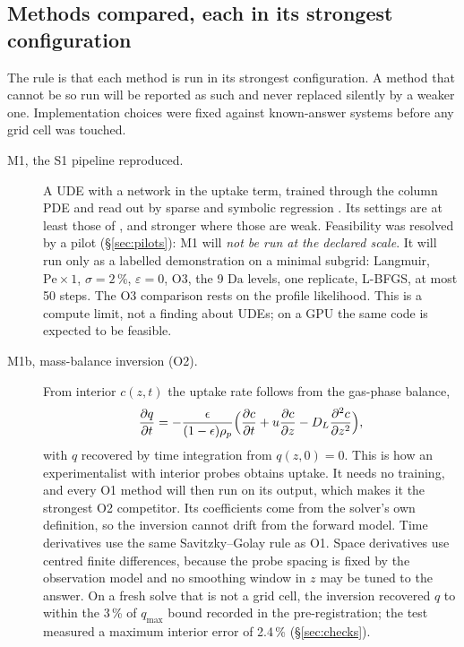 \documentclass[11pt]{article}
\newcommand{\Da}{\mathrm{Da}}
\newcommand{\Pe}{\mathrm{Pe}}
\begin{document}
\subsection{Methods compared, each in its strongest configuration}
\label{sec:compet}
The rule is that each method is run in its strongest configuration. A method that cannot be
so run will be reported as such and never replaced silently by a weaker one.
Implementation choices were fixed against known-answer systems before any grid cell was
touched.

\begin{description}
\item[M1, the S1 pipeline reproduced.] A UDE with a network in the uptake term, trained
through the column PDE and read out by sparse and symbolic regression
\citep{santana2023}. Its settings are at least those of \citep{santana2023}, and stronger
where those are weak. Feasibility was resolved by a pilot (\S\ref{sec:pilots}): M1 will
\emph{not be run at the declared scale}. It will run only as a labelled demonstration on a
minimal subgrid: Langmuir, $\Pe \times 1$, $\sigma = 2\,\%$, $\varepsilon = 0$, O3, the
9 $\Da$ levels, one replicate, L-BFGS, at most 50 steps. The O3 comparison rests on the
profile likelihood. This is a compute limit, not a finding about UDEs; on a GPU the same
code is expected to be feasible.

\item[M1b, mass-balance inversion (O2).] From interior $c(z,t)$ the uptake rate follows
from the gas-phase balance,
\begin{equation}
\frac{\partial q}{\partial t} = -\frac{\epsilon}{(1-\epsilon)\rho_p}\Bigl(
\frac{\partial c}{\partial t} + u\frac{\partial c}{\partial z} - D_L
\frac{\partial^2 c}{\partial z^2}\Bigr),
\end{equation}
with $q$ recovered by time integration from $q(z,0) = 0$. This is how an experimentalist
with interior probes obtains uptake. It needs no training, and every O1 method will then
run on its output, which makes it the strongest O2 competitor. Its coefficients come from
the solver's own definition, so the inversion cannot drift from the forward model. Time
derivatives use the same Savitzky--Golay rule as O1. Space derivatives use centred
finite differences, because the probe spacing is fixed by the observation model and no
smoothing window in $z$ may be tuned to the answer.
On a fresh solve that is not a grid cell, the inversion recovered $q$ to within the 3\,\%
of $q_{\max}$ bound recorded in the pre-registration; the test measured a maximum
interior error of 2.4\,\% (\S\ref{sec:checks}).


\end{description}
\end{document}
